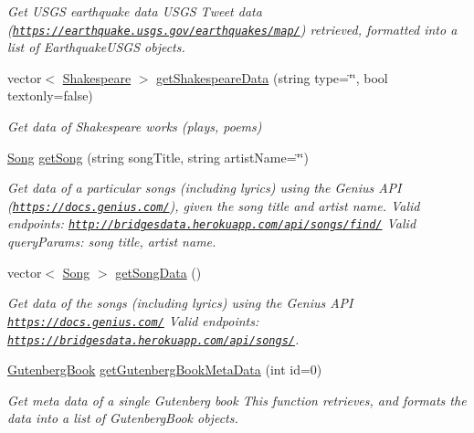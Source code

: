 \begin{DoxyCompactItemize}
\begin{DoxyCompactList}\small\item\em Get U\+S\+GS earthquake data U\+S\+GS Tweet data (\href{https://earthquake.usgs.gov/earthquakes/map/}{\tt https\+://earthquake.\+usgs.\+gov/earthquakes/map/}) retrieved, formatted into a list of Earthquake\+U\+S\+GS objects. \end{DoxyCompactList}\item 
vector$<$ \hyperlink{classbridges_1_1dataset_1_1_shakespeare}{Shakespeare} $>$ \hyperlink{classbridges_1_1_data_source_a8b73299a4c1c71d2e32431a8d4a7be81}{get\+Shakespeare\+Data} (string type=\char`\"{}\char`\"{}, bool textonly=false)
\begin{DoxyCompactList}\small\item\em Get data of Shakespeare works (plays, poems) \end{DoxyCompactList}\item 
\hyperlink{classbridges_1_1dataset_1_1_song}{Song} \hyperlink{classbridges_1_1_data_source_a7797e423d77ad467f9d98ebf78488c04}{get\+Song} (string song\+Title, string artist\+Name=\char`\"{}\char`\"{})
\begin{DoxyCompactList}\small\item\em Get data of a particular songs (including lyrics) using the Genius A\+PI (\href{https://docs.genius.com/}{\tt https\+://docs.\+genius.\+com/}), given the song title and artist name. Valid endpoints\+: \href{http://bridgesdata.herokuapp.com/api/songs/find/}{\tt http\+://bridgesdata.\+herokuapp.\+com/api/songs/find/} Valid query\+Params\+: song title, artist name. \end{DoxyCompactList}\item 
vector$<$ \hyperlink{classbridges_1_1dataset_1_1_song}{Song} $>$ \hyperlink{classbridges_1_1_data_source_a5e8d035a1becf96c71569e0966e93849}{get\+Song\+Data} ()
\begin{DoxyCompactList}\small\item\em Get data of the songs (including lyrics) using the Genius A\+PI \href{https://docs.genius.com/}{\tt https\+://docs.\+genius.\+com/} Valid endpoints\+: \href{https://bridgesdata.herokuapp.com/api/songs/}{\tt https\+://bridgesdata.\+herokuapp.\+com/api/songs/}. \end{DoxyCompactList}\item 
\hyperlink{classbridges_1_1dataset_1_1_gutenberg_book}{Gutenberg\+Book} \hyperlink{classbridges_1_1_data_source_afd35b643076829e23ddad6448cd15b2f}{get\+Gutenberg\+Book\+Meta\+Data} (int id=0)
\begin{DoxyCompactList}\small\item\em Get meta data of a single Gutenberg book This function retrieves, and formats the data into a list of Gutenberg\+Book objects. \end{DoxyCompactList}\item 

\end{DoxyCompactItemize}
